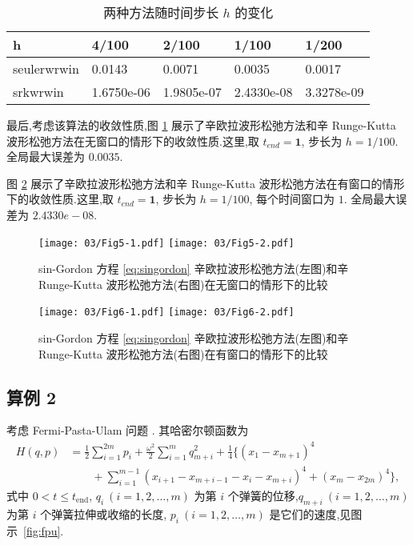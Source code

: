 \begin{table}[h!]
    \begin{center}
    \caption{两种方法随时间步长 $h$ 的变化}
    \label{tbl:order}
    \begin{tabularx}{\linewidth}{XXXXX}
        \toprule[1.5pt]
        h & 4/100 & 2/100 & 1/100 & 1/200\\
        \midrule[1pt]
        seulerwrwin & 0.0143 &0.0071 &0.0035 &0.0017\\
        srkwrwin    & 1.6750e-06 & 1.9805e-07 & 2.4330e-08 & 3.3278e-09\\
        \bottomrule[1.5pt]
    \end{tabularx}
    \end{center}
  \end{table}

最后,考虑该算法的收敛性质,图 \ref{fig:ex1err} 展示了辛欧拉波形松弛方法和辛 Runge-Kutta 波形松弛方法在无窗口的情形下的收敛性质.这里,取 $t_{end} =\textbf{1}$, 步长为 $h=1/100$. 全局最大误差为 $0.0035$.

图 \ref{fig:ex1winerr} 展示了辛欧拉波形松弛方法和辛 Runge-Kutta 波形松弛方法在有窗口的情形下的收敛性质.这里,取 $t_{end} =\textbf{1}$, 步长为 $h=1/100$, 每个时间窗口为 $1$. 全局最大误差为 $2.4330e-08$.

\begin{figure}[h!]
  \centering
  \texttt{[image: 03/Fig5-1.pdf]}
  \texttt{[image: 03/Fig5-2.pdf]}
  \caption{sin-Gordon 方程 \eqref{eq:singordon} 辛欧拉波形松弛方法(左图)和辛 Runge-Kutta 波形松弛方法(右图)在无窗口的情形下的比较}
  \label{fig:ex1err}
\end{figure}

\begin{figure}[h!]
  \centering
  \texttt{[image: 03/Fig6-1.pdf]}
  \texttt{[image: 03/Fig6-2.pdf]}
  \caption{sin-Gordon 方程 \eqref{eq:singordon} 辛欧拉波形松弛方法(左图)和辛 Runge-Kutta 波形松弛方法(右图)在有窗口的情形下的比较}
  \label{fig:ex1winerr}
\end{figure}

\subsection*{算例 2}
考虑 Fermi-Pasta-Ulam 问题 \cite{hairer2006geometric}. 其哈密尔顿函数为
\begin{equation*}
  \begin{aligned}
    H(q,p) &= \displaystyle{\frac{1}{2}} \sum_{i=1}^{2m} p_i +
    \displaystyle{\frac{\omega^2}{2}} \sum_{i=1}^{m} q_{m+i}^2 +
    \displaystyle{\frac{1}{4}}  \{ (x_1 - x_{m+1})^4 \\
    & \qquad + \sum_{i=1}^{m-1} (x_{i+1} - x_{m+i-1} - x_i - x_{m+i})^4 + (x_{m}
    - x_{2m})^4\},
  \end{aligned}
\end{equation*}
式中 $0<t\leq t_{\text{end}}$, $q_i~(i=1,2,\ldots,m)$ 为第 $i$ 个弹簧的位移,$q_{m+i}~(i=1,2,\ldots,m)$ 为第 $i$ 个弹簧拉伸或收缩的长度, $p_i~(i=1,2,\ldots,m)$ 是它们的速度,见图示~\ref{fig:fpu}.

